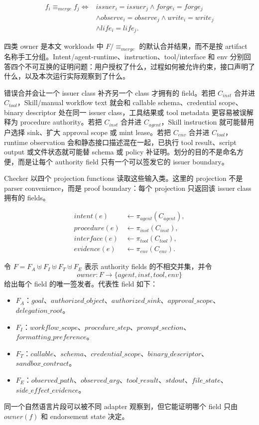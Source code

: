 \documentclass[UTF8,a4paper,11pt]{ctexart}
\begin{document}
\[
\begin{aligned}
f_i \equiv_{merge} f_j
\iff{}& issuer_i=issuer_j \land forge_i=forge_j\\
&\land observe_i=observe_j \land write_i=write_j\\
&\land life_i=life_j .
\end{aligned}
\]

四类 owner 是本文 workloads 中 \(F/\!\equiv_{merge}\) 的默认合并结果，而不是按 artifact 名称手工分组。Intent/agent-runtime、instruction、tool/interface 和 env 分别回答四个不可互换的证明问题：用户授权了什么，过程如何被允许约束，接口声明了什么，以及本次运行实际观察到了什么。

错误合并会让一个 issuer class 补齐另一个 class 才拥有的 field。若把 \(C_{inst}\) 合并进 \(C_{tool}\)，Skill/manual workflow text 就会和 callable schema、credential scope、binary descriptor 处在同一 issuer class，工具结果或 tool metadata 更容易被误解释为 procedure authority。若把 \(C_{inst}\) 合并进 \(C_{agent}\)，Skill instruction 就可能替用户选择 sink、扩大 approval scope 或 mint lease。若把 \(C_{env}\) 合并进 \(C_{tool}\)，runtime observation 会和静态接口描述混在一起，已执行 tool result、script output 或文件状态就可能替 schema 或 policy 补证明。划分的目的不是命名方便，而是让每个 authority field 只有一个可以签发它的 issuer boundary。

Checker 以四个 projection functions 读取这些输入类。这里的 projection 不是 parser convenience，而是 proof boundary：每个 projection 只返回该 issuer class 拥有的 fields。

\[
\begin{aligned}
intent(e) &\leftarrow \pi_{agent}(C_{agent}),\\
procedure(e) &\leftarrow \pi_{inst}(C_{inst}),\\
interface(e) &\leftarrow \pi_{tool}(C_{tool}),\\
evidence(e) &\leftarrow \pi_{env}(C_{env}) .
\end{aligned}
\]

令 \(F=F_A\uplus F_I\uplus F_T\uplus F_E\) 表示 authority fields 的不相交并集，并令
\[
owner:F\rightarrow\{agent,inst,tool,env\}
\]
给出每个 field 的唯一签发者。代表性 field 如下：
\begin{itemize}[leftmargin=*]
  \item \(F_A\)：\(goal\)、\(authorized\_object\)、\(authorized\_sink\)、\(approval\_scope\)、\(delegation\_root\)。
  \item \(F_I\)：\(workflow\_scope\)、\(procedure\_step\)、\(prompt\_section\)、\(formatting\_preference\)。
  \item \(F_T\)：\(callable\)、\(schema\)、\(credential\_scope\)、\(binary\_descriptor\)、\(sandbox\_contract\)。
  \item \(F_E\)：\(observed\_path\)、\(observed\_arg\)、\(tool\_result\)、\(stdout\)、\(file\_state\)、\(side\_effect\_evidence\)。
\end{itemize}
同一个自然语言片段可以被不同 adapter 观察到，但它能证明哪个 field 只由 \(owner(f)\) 和 endorsement state 决定。
\end{document}
